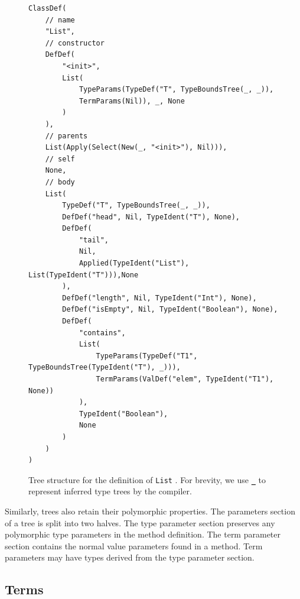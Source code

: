\begin{figure}[!htb]
\begin{verbatim}
ClassDef(
	// name
	"List",
	// constructor
	DefDef(
		"<init>",
		List(
			TypeParams(TypeDef("T", TypeBoundsTree(_, _)),
			TermParams(Nil)), _, None
		)
	),
	// parents
	List(Apply(Select(New(_, "<init>"), Nil))),
	// self
	None,
	// body
	List(
		TypeDef("T", TypeBoundsTree(_, _)),
		DefDef("head", Nil, TypeIdent("T"), None),
		DefDef(
			"tail", 
			Nil, 
			Applied(TypeIdent("List"), List(TypeIdent("T"))),None
		),
		DefDef("length", Nil, TypeIdent("Int"), None),
		DefDef("isEmpty", Nil, TypeIdent("Boolean"), None),
		DefDef(
			"contains",
			List(
				TypeParams(TypeDef("T1", TypeBoundsTree(TypeIdent("T"), _))),
				TermParams(ValDef("elem", TypeIdent("T1"), None))
			),
			TypeIdent("Boolean"),
			None
		)
	)
)
\end{verbatim}
\caption{Tree structure for the definition of \texttt{List} . For brevity, we use \textbf{\texttt{\_}} to represent inferred\cite{ml:type-inference} type trees by the compiler.}
\label{tasty:list}
\end{figure}

Similarly,  trees also retain their polymorphic properties.
The parameters section of a  tree is split into two halves.
The type parameter section preserves any polymorphic type parameters in the method definition.
The term parameter section contains the normal value parameters found in a method.
Term parameters may have types derived from the type parameter section.

\subsection{Terms}
\label{section:tasty:terms}

